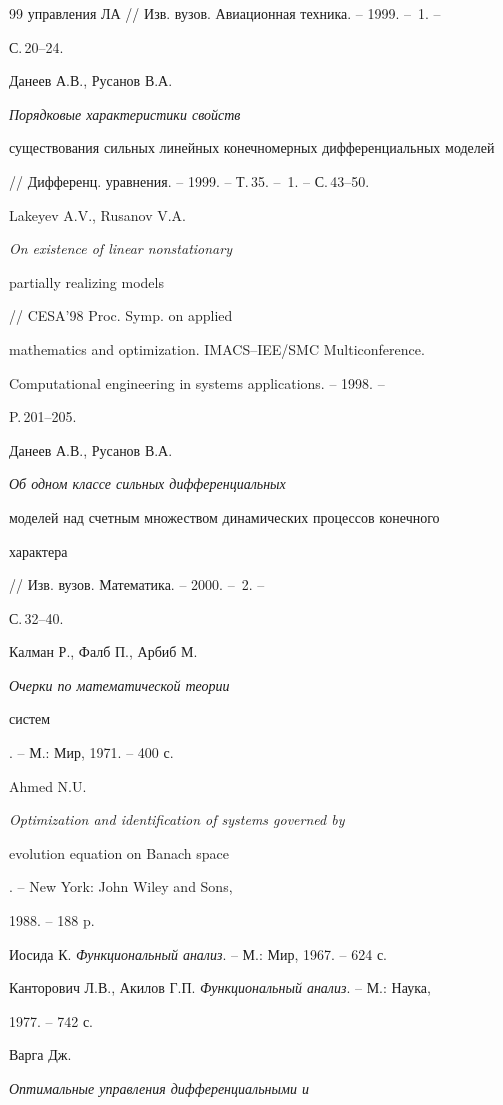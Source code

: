 \begin{thebibliography}{99}
{управления ЛА} // Изв. вузов. Авиационная техника. -- 1999. -- \No\,1. -- 


С.\,20--24. 




Данеев А.В., Русанов В.А. {\em Порядковые характеристики свойств 


существования сильных линейных конечномерных дифференциальных моделей} 


// Дифференц. уравнения. -- 1999. -- Т.\,35. -- \No\,1. -- С.\,43--50. 




Lakeyev A.V., Rusanov V.A. {\em On existence of linear nonstationary 


partially realizing models} // CESA'98 Proc. Symp. on applied 


mathematics and optimization. IMACS--IEE/SMC Multiconference. 


Computational engineering in systems applications. -- 1998. -- 


P.\,201--205. 




Данеев А.В., Русанов В.А. {\em Об одном классе сильных дифференциальных 


моделей над счетным множеством динамических процессов конечного 


характера} // Изв. вузов. Математика. -- 2000. -- \No\,2. -- 


С.\,32--40. 




Калман Р., Фалб П., Арбиб М. {\em Очерки по математической теории 


систем}. -- М.: Мир, 1971. -- 400 с. 




Ahmed N.U. {\em Optimization and identification of systems governed by 


evolution equation on Banach space}. -- New York: John Wiley and Sons, 


1988. -- 188 p. 




Иосида К. {\em Функциональный анализ}. -- М.: Мир, 1967. -- 624 с. 




Канторович Л.В., Акилов Г.П. {\em Функциональный анализ}. -- М.: Наука, 


1977. -- 742 с. 




Варга Дж. {\em Оптимальные управления дифференциальными и 


}
\end{thebibliography}
